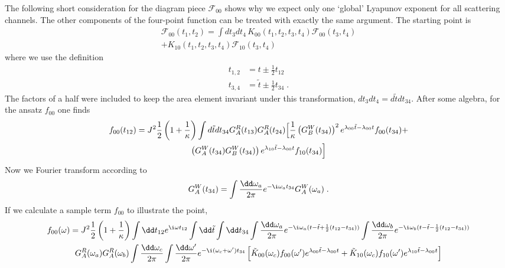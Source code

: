 The following short consideration for the diagram piece $\mathcal{F}_{00}$ shows why we expect only one `global' Lyapunov exponent for all scattering channels.
The other components of the four-point function can be treated with exactly the same argument. The starting point is
%
\begin{multline}
	\mathcal{F}_{00}(t_1,t_2) = \int dt_3 dt_4\, K_{00}(t_1,t_2,t_3,t_4)\mathcal{F}_{00}(t_3,t_4) \\ + K_{10}(t_1,t_2,t_3,t_4)\mathcal{F}_{10}(t_3,t_4)
\end{multline}
%
where we use the definition 
%
\begin{align}
	t_{1,2} &= t \pm \frac{1}{2}t_{12} \nonumber \\
	t_{3,4} &= \tilde{t} \pm \frac{1}{2}t_{34} \;.
\end{align}
%
The factors of a half were included to keep the area element invariant under this transformation,
$dt_3dt_4 = d\tilde{t}dt_{34}$. After some algebra, for the ansatz $f_{00}$ one finds
%
	\begin{multline}
		f_{00}(t_{12}) = 
		J^2\frac12 \left(1+ \frac1\kappa\right) \int d\tilde{t}dt_{34} G^R_A(t_{13})G^R_A(t_{24})\Big{[}\frac{1}{\kappa}\left(G^W_B(t_{34})\right)^2 e^{\lambda_{00}\tilde{t} - \lambda_{00} t}f_{00}(t_{34}) + \\  \left(G^W_A(t_{34})G^W_B(t_{34})\right) e^{\lambda_{10}\tilde{t} - \lambda_{00} t}f_{10}(t_{34}) \Big{]}
	\end{multline}
%
Now we Fourier transform according to 
%
\begin{equation}
	G^W_A(t_{34}) = \int \frac{\dd\omega_a}{2\pi} e^{-\i\omega_a t_{34}} G^W_A(\omega_a)\;.
\end{equation}
	If we calculate a sample term $f_{00}$ to illustrate the point, 
	\begin{multline}
		f_{00}(\omega) = J^2\frac12 \left(1+ \frac1\kappa\right)\int \dd t_{12} e^{\i\omega t_{12}}\int \dd \tilde{t}\int \dd t_{34} \int \frac{\dd\omega_a}{2\pi} e^{-\i\omega_a(t - \tilde{t} + \frac{1}{2}(t_{12}-t_{34}))}\int \frac{\dd\omega_b}{2\pi} e^{-\i\omega_b(t - \tilde{t} - \frac{1}{2}(t_{12}-t_{34}))} \\
		G^R_A(\omega_a)G^R_A(\omega_b)\int\frac{\dd\omega_c}{2\pi}\int\frac{\dd\omega^\prime}{2\pi} e^{-\i(\omega_c +\omega^\prime)t_{34}}
		\left[\tilde{K}_{00}(\omega_c)f_{00}(\omega^\prime) e^{\lambda_{00}\tilde{t} - \lambda_{00}t} + \tilde{K}_{10}(\omega_c)f_{10}(\omega^\prime) e^{\lambda_{10}\tilde{t} - \lambda_{00}t}\right]
	\end{multline}
